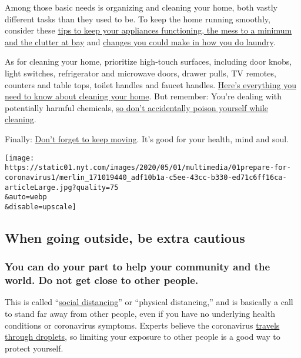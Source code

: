 Among those basic needs is organizing and cleaning your home, both
vastly different tasks than they used to be. To keep the home running
smoothly, consider these
\href{https://www.nytimes.com/2020/04/02/smarter-living/protect-your-home-against-the-onslaught.html}{tips
to keep your appliances functioning, the mess to a minimum and the
clutter at bay} and
\href{https://www.nytimes.com/2020/03/26/style/how-to-do-laundry-coronavirus.html}{changes
you could make in how you do laundry}.

As for cleaning your home, prioritize high-touch surfaces, including
door knobs, light switches, refrigerator and microwave doors, drawer
pulls, TV remotes, counters and table tops, toilet handles and faucet
handles.
\href{https://www.nytimes.com/2020/03/18/world/clean-home-coronavirus.html}{Here's
everything you need to know about cleaning your home}. But remember:
You're dealing with potentially harmful chemicals,
\href{https://www.nytimes.com/2020/04/02/smarter-living/coronavirus-clean-home-house-disinfect.html}{so
don't accidentally poison yourself while cleaning}.

Finally:
\href{https://www.nytimes.com/2020/04/01/well/move/steps-walking-longevity-health.html}{Don't
forget to keep moving}. It's good for your health, mind and soul.

\texttt{[image: https://static01.nyt.com/images/2020/05/01/multimedia/01prepare-for-coronavirus1/merlin\_171019440\_adf10b1a-c5ee-43cc-b330-ed71c6ff16ca-articleLarge.jpg?quality=75\\\&auto=webp\\\&disable=upscale]}

\hypertarget{when-going-outside-be-extra-cautious}{%
\subsection{When going outside, be extra
cautious}\label{when-going-outside-be-extra-cautious}}

\hypertarget{you-can-do-your-part-to-help-your-community-and-the-world-do-not-get-close-to-other-people}{%
\subsubsection{You can do your part to help your community and the
world. Do not get close to other
people.}\label{you-can-do-your-part-to-help-your-community-and-the-world-do-not-get-close-to-other-people}}

This is called
``\href{https://www.nytimes.com/2020/03/16/smarter-living/coronavirus-social-distancing.html}{social
distancing}'' or ``physical distancing,'' and is basically a call to
stand far away from other people, even if you have no underlying health
conditions or coronavirus symptoms. Experts believe the coronavirus
\href{https://www.nytimes.com/2020/03/02/health/coronavirus-how-it-spreads.html}{travels
through droplets}, so limiting your exposure to other people is a good
way to protect yourself.

